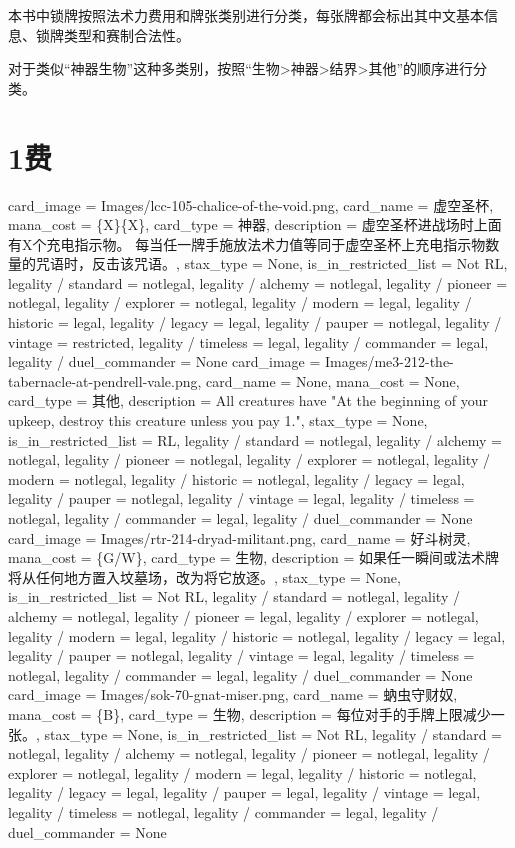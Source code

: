 \documentclass[lang = cn, color = black, 10pt]{AllThatStax}
\begin{document}
本书中锁牌按照法术力费用和牌张类别进行分类，每张牌都会标出其中文基本信息、锁牌类型和赛制合法性。

对于类似“神器生物”这种多类别，按照“生物>神器>结界>其他”的顺序进行分类。

\tableofcontents

\mainmatter

\chapter{1费}

\card
{
	card_image = Images/lcc-105-chalice-of-the-void.png,
	card_name = 虚空圣杯,
	mana_cost = \{X\}\{X\},
	card_type = 神器,
	description = 虚空圣杯进战场时上面有X个充电指示物。
	每当任一牌手施放法术力值等同于虚空圣杯上充电指示物数量的咒语时，反击该咒语。,
	stax_type = None,
	is_in_restricted_list = Not RL,
	legality / standard = notlegal,
	legality / alchemy = notlegal,
	legality / pioneer = notlegal,
	legality / explorer = notlegal,
	legality / modern = legal,
	legality / historic = legal,
	legality / legacy = legal,
	legality / pauper = notlegal,
	legality / vintage = restricted,
	legality / timeless = legal,
	legality / commander = legal,
	legality / duel_commander = None
}
\card
{
	card_image = Images/me3-212-the-tabernacle-at-pendrell-vale.png,
	card_name = None,
	mana_cost = None,
	card_type = 其他,
	description = All creatures have "At the beginning of your upkeep, destroy this creature unless you pay {1}.",
	stax_type = None,
	is_in_restricted_list = RL,
	legality / standard = notlegal,
	legality / alchemy = notlegal,
	legality / pioneer = notlegal,
	legality / explorer = notlegal,
	legality / modern = notlegal,
	legality / historic = notlegal,
	legality / legacy = legal,
	legality / pauper = notlegal,
	legality / vintage = legal,
	legality / timeless = notlegal,
	legality / commander = legal,
	legality / duel_commander = None
}
\card
{
	card_image = Images/rtr-214-dryad-militant.png,
	card_name = 好斗树灵,
	mana_cost = \{G/W\},
	card_type = 生物,
	description = 如果任一瞬间或法术牌将从任何地方置入坟墓场，改为将它放逐。,
	stax_type = None,
	is_in_restricted_list = Not RL,
	legality / standard = notlegal,
	legality / alchemy = notlegal,
	legality / pioneer = legal,
	legality / explorer = notlegal,
	legality / modern = legal,
	legality / historic = notlegal,
	legality / legacy = legal,
	legality / pauper = notlegal,
	legality / vintage = legal,
	legality / timeless = notlegal,
	legality / commander = legal,
	legality / duel_commander = None
}
\card
{
	card_image = Images/sok-70-gnat-miser.png,
	card_name = 蚋虫守财奴,
	mana_cost = \{B\},
	card_type = 生物,
	description = 每位对手的手牌上限减少一张。,
	stax_type = None,
	is_in_restricted_list = Not RL,
	legality / standard = notlegal,
	legality / alchemy = notlegal,
	legality / pioneer = notlegal,
	legality / explorer = notlegal,
	legality / modern = legal,
	legality / historic = notlegal,
	legality / legacy = legal,
	legality / pauper = legal,
	legality / vintage = legal,
	legality / timeless = notlegal,
	legality / commander = legal,
	legality / duel_commander = None
}
\end{document}
